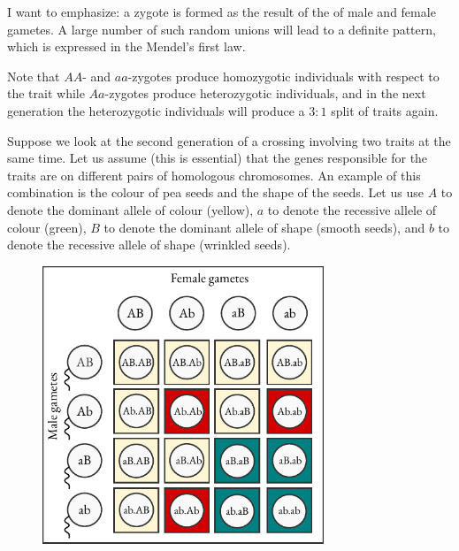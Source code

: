 I want to emphasize: a zygote is formed as the result of the   of male and female gametes. A large number of such random
unions will   lead to a definite pattern, which is expressed in the Mendel's first law.

Note that $AA$- and $aa$-zygotes produce homozygotic individuals with
respect to the trait while $Aa$-zygotes produce heterozygotic individuals,
and in the next generation the heterozygotic individuals will produce
a $3:1$ split of traits again.

 Suppose we look at the second generation of a crossing involving two traits at the same time.
Let us assume (this is essential) that the genes responsible for the traits
are on different pairs of homologous chromosomes. An example of this
combination is the colour of pea seeds and the shape of the seeds. Let
us use $A$ to denote the dominant allele of colour (yellow), $a$ to denote
the recessive allele of colour (green), $B$ to denote the dominant allele of
shape (smooth seeds), and $b$ to denote the recessive allele of shape
(wrinkled seeds).

\begin{figure}[!ht]
\centering
\includegraphics[width=0.75\textwidth]{figures/genes2.pdf}
\end{figure}


